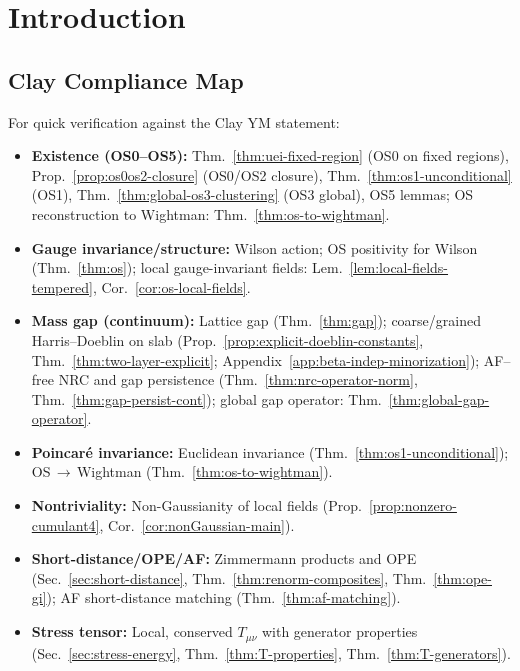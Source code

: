 \documentclass[11pt]{amsart}
\theoremstyle{plain}
\theoremstyle{definition}
\theoremstyle{remark}
\begin{document}
\section{Introduction}
\vspace{8pt}
\subsection*{Clay Compliance Map}
For quick verification against the Clay YM statement:
\begin{itemize}[leftmargin=2em, itemsep=6pt, parsep=3pt]
  \item \textbf{Existence (OS0--OS5):} Thm.~\ref{thm:uei-fixed-region} (OS0 on fixed regions), Prop.~\ref{prop:os0os2-closure} (OS0/OS2 closure), Thm.~\ref{thm:os1-unconditional} (OS1), Thm.~\ref{thm:global-os3-clustering} (OS3 global), OS5 lemmas; OS reconstruction to Wightman: Thm.~\ref{thm:os-to-wightman}.
  \item \textbf{Gauge invariance/structure:} Wilson action; OS positivity for Wilson (Thm.~\ref{thm:os}); local gauge-invariant fields: Lem.~\ref{lem:local-fields-tempered}, Cor.~\ref{cor:os-local-fields}.
  \item \textbf{Mass gap (continuum):} Lattice gap (Thm.~\ref{thm:gap}); coarse/grained Harris--Doeblin on slab (Prop.~\ref{prop:explicit-doeblin-constants}, Thm.~\ref{thm:two-layer-explicit}; Appendix~\ref{app:beta-indep-minorization}); AF--free NRC and gap persistence (Thm.~\ref{thm:nrc-operator-norm}, Thm.~\ref{thm:gap-persist-cont}); global gap operator: Thm.~\ref{thm:global-gap-operator}.
\item \textbf{Poincar\'e invariance:} Euclidean invariance (Thm.~\ref{thm:os1-unconditional}); OS\,$\to$\,Wightman (Thm.~\ref{thm:os-to-wightman}).
  \item \textbf{Nontriviality:} Non-Gaussianity of local fields (Prop.~\ref{prop:nonzero-cumulant4}, Cor.~\ref{cor:nonGaussian-main}).
  \item \textbf{Short-distance/OPE/AF:} Zimmermann products and OPE (Sec.~\ref{sec:short-distance}, Thm.~\ref{thm:renorm-composites}, Thm.~\ref{thm:ope-gi}); AF short-distance matching (Thm.~\ref{thm:af-matching}).
  \item \textbf{Stress tensor:} Local, conserved $T_{\mu\nu}$ with generator properties (Sec.~\ref{sec:stress-energy}, Thm.~\ref{thm:T-properties}, Thm.~\ref{thm:T-generators}).
\end{itemize}
\end{document}
